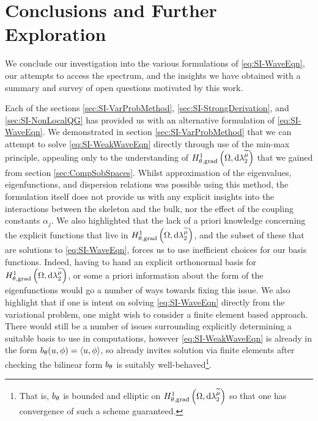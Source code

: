 \section{Conclusions and Further Exploration} \label{sec:SI-Conc}
We conclude our investigation into the various formulations of \eqref{eq:SI-WaveEqn}, our attempts to access the spectrum, and the insights we have obtained with a summary and survey of open questions motivated by this work.

Each of the sections \ref{sec:SI-VarProbMethod}, \ref{sec:SI-StrongDerivation}, and \ref{sec:SI-NonLocalQG} has provided us with an alternative formulation of \eqref{eq:SI-WaveEqn}.
We demonstrated in section \ref{sec:SI-VarProbMethod} that we can attempt to solve \eqref{eq:SI-WeakWaveEqn} directly through use of the min-max principle, appealing only to the understanding of $H^1_{\theta, \mathrm{grad}}\left( \Omega, \mathrm{d}\lambda_2^{\widetilde{\mu}} \right)$ that we gained from section \ref{sec:CompSobSpaces}.
Whilst approximation of the eigenvalues, eigenfunctions, and dispersion relations was possible using this method, the formulation itself does not provide us with any explicit insights into the interactions between the skeleton and the bulk, nor the effect of the coupling constants $\alpha_j$.
We also highlighted that the lack of a priori knowledge concerning the explicit functions that live in $H^1_{\theta, \mathrm{grad}}\left( \Omega, \mathrm{d}\lambda_2^{\widetilde{\mu}} \right)$, and the subset of these that are solutions to \eqref{eq:SI-WaveEqn}, forces us to use inefficient choices for our basis functions.
Indeed, having to hand an explicit orthonormal basis for $H^1_{\theta, \mathrm{grad}}\left( \Omega, \mathrm{d}\lambda_2^{\widetilde{\mu}} \right)$, or some a priori information about the form of the eigenfunctions would go a number of ways towards fixing this issue.
We also highlight that if one is intent on solving \eqref{eq:SI-WaveEqn} directly from the variational problem, one might wish to consider a finite element based approach.
There would still be a number of issues surrounding explicitly determining a suitable basis to use in computations, however \eqref{eq:SI-WeakWaveEqn} is already in the form $b_{\theta}(u,\phi)=\left\langle u , \phi \right\rangle$, so already invites solution via finite elements after checking the bilinear form $b_{\theta}$ is suitably well-behaved\footnote{That is, $b_{\theta}$ is bounded and elliptic on $H^1_{\theta, \mathrm{grad}}\left( \Omega, \mathrm{d}\lambda_2^{\widetilde{\mu}} \right)$ so that one has convergence of such a scheme guaranteed.}.

